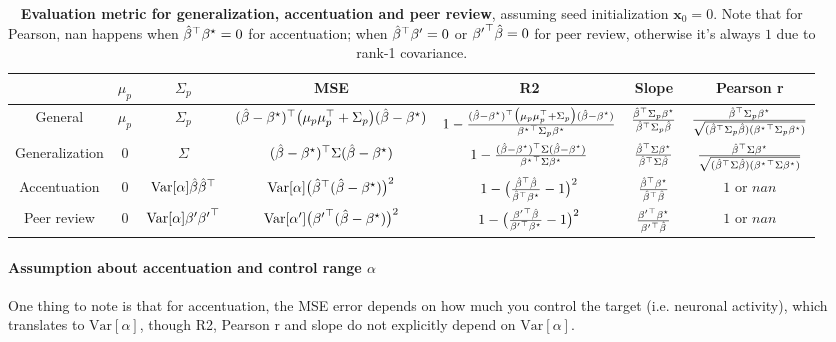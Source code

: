 \begin{table}
\begin{centering}
\begin{tabular}{|c|c|c|c|c|c|c|}
\hline
 & $\mu_{p}$ & $\Sigma_{p}$ & MSE & R2 & Slope & Pearson r\tabularnewline
\hline
\hline
General & $\mu_{p}$ & $\Sigma_{p}$ & $(\hat{\beta}-{\beta^{\star}})^{\top}\big(\mu_{p}\mu_{p}^{\top}+\Sigma_{p}\big)(\hat{\beta}-{\beta^{\star}})$ & $1-\frac{(\hat{\beta}-{\beta^{\star}})^{\top}\big(\mu_{p}\mu_{p}^{\top}+\Sigma_{p}\big)(\hat{\beta}-{\beta^{\star}})}{{{\beta^{\star}}}^{\top}\Sigma_{p}{\beta^{\star}}}$ & $\frac{{\hat{\beta}}^{\top}\Sigma_{p}{\beta^{\star}}}{{\hat{\beta}}^{\top}\Sigma_{p}\hat{\beta}}$ & $\frac{{\hat{\beta}}^{\top}\Sigma_{p}{\beta^{\star}}}{\sqrt{({\hat{\beta}}^{\top}\Sigma_{p}\hat{\beta})({{\beta^{\star}}}^{\top}\Sigma_{p}{\beta^{\star}})}}$\tabularnewline
\hline
Generalization & $0$ & $\Sigma$ & $(\hat{\beta}-{\beta^{\star}})^{\top}\Sigma(\hat{\beta}-{\beta^{\star}})$ & $1-\frac{(\hat{\beta}-{\beta^{\star}})^{\top}\Sigma(\hat{\beta}-{\beta^{\star}})}{{{\beta^{\star}}}^{\top}\Sigma{\beta^{\star}}}$ & $\frac{{\hat{\beta}}^{\top}\Sigma{\beta^{\star}}}{{\hat{\beta}}^{\top}\Sigma\hat{\beta}}$ & $\frac{{\hat{\beta}}^{\top}\Sigma{\beta^{\star}}}{\sqrt{({\hat{\beta}}^{\top}\Sigma\hat{\beta})({{\beta^{\star}}}^{\top}\Sigma{\beta^{\star}})}}$\tabularnewline
\hline
Accentuation & $0$ & $\mathrm{Var}[\alpha]\hat{\beta}{\hat{\beta}}^{\top}$ & $\mathrm{Var}[\alpha]\big({\hat{\beta}}^{\top}(\hat{\beta}-{\beta^{\star}})\big)^{2}$ & $1-\big(\frac{{\hat{\beta}}^{\top}\hat{\beta}}{{\hat{\beta}}^{\top}{\beta^{\star}}}-1\big)^{2}$ & $\frac{{\hat{\beta}}^{\top}{\beta^{\star}}}{{\hat{\beta}}^{\top}\hat{\beta}}$ & $1$ or $nan$\tabularnewline
\hline
Peer review & $0$ & $\mathrm{Var}[\alpha]{\beta^{\prime}}{{\beta^{\prime}}}^{\top}$ & $\mathrm{Var}[\alpha^{\prime}]\big({{\beta^{\prime}}}^{\top}(\hat{\beta}-{\beta^{\star}})\big)^{2}$ & $1-\big(\frac{{{\beta^{\prime}}}^{\top}\hat{\beta}}{{{\beta^{\prime}}}^{\top}{\beta^{\star}}}-1\big)^{2}$ & $\frac{{{\beta^{\prime}}}^{\top}{\beta^{\star}}}{{{\beta^{\prime}}}^{\top}\hat{\beta}}$ & $1$ or $nan$\tabularnewline
\hline
\end{tabular}
\par\end{centering}
\caption{\textbf{Evaluation metric for generalization, accentuation and peer
review}, assuming seed initialization $\mathbf{x}_{0}=0$. Note that
for Pearson, nan happens when ${\hat{\beta}}^{\top}{\beta^{\star}}=0$
for accentuation; when ${\hat{\beta}}^{\top}{\beta^{\prime}}=0$ or ${{\beta^{\prime}}}^{\top}\hat{\beta}=0$
for peer review, otherwise it's always $1$ due to rank-1 covariance. }\label{tab:theory-Evaluation-metrics}
\end{table}


\paragraph{Assumption about accentuation and control range $\alpha$}

One thing to note is that for accentuation, the MSE error depends
on how much you control the target (i.e. neuronal activity), which
translates to $\mathrm{Var}[\alpha]$, though R2, Pearson r and slope
do not explicitly depend on $\mathrm{Var}[\alpha]$.


